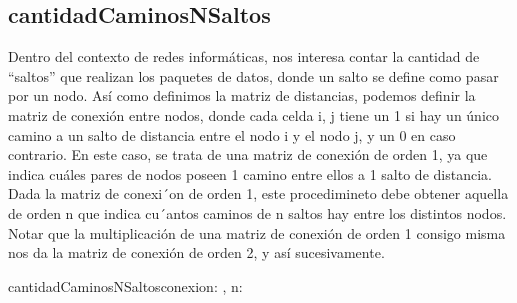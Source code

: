 \documentclass[10pt,a4paper]{article}
\begin{document}
\subsection {cantidadCaminosNSaltos}
Dentro del contexto de redes informáticas, nos interesa contar la cantidad de “saltos”
que realizan los paquetes de datos, donde un salto se define como pasar por un nodo.
Así como definimos la matriz de distancias, podemos definir la matriz de conexión entre nodos, donde cada celda i, j
tiene un 1 si hay un único camino a un salto de distancia entre el nodo i y el nodo j, y un 0 en caso contrario. En este
caso, se trata de una matriz de conexión de orden 1, ya que indica cuáles pares de nodos poseen 1 camino entre ellos a
1 salto de distancia.
Dada la matriz de conexi´on de orden 1, este procedimineto debe obtener aquella de orden n que indica cu´antos caminos
de n saltos hay entre los distintos nodos. Notar que la multiplicación de una matriz de conexión de orden 1 consigo
misma nos da la matriz de conexión de orden 2, y así sucesivamente.
\vspace{0.3cm}
\begin{proc}{cantidadCaminosNSaltos}{\Inout conexion: \TLista{\TLista{\ent}}, \In n:\ent }{}


	\vspace{0.2cm}
	
\end{proc}

\end{document}
